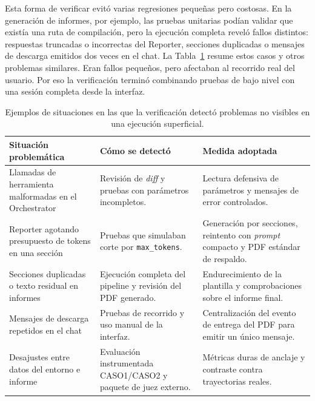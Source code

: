 Esta forma de verificar evitó varias regresiones pequeñas pero costosas. En la
generación de informes, por ejemplo, las pruebas unitarias podían validar
que existía una ruta de compilación, pero la ejecución completa reveló
fallos distintos: respuestas truncadas o incorrectas del Reporter, secciones
duplicadas o mensajes de descarga emitidos dos veces en el chat. La
Tabla~\ref{tab:problemas-verificacion} resume estos casos y otros problemas
similares. Eran fallos pequeños, pero afectaban al recorrido real del usuario.
Por eso la verificación terminó combinando pruebas de bajo nivel con una
sesión completa desde la interfaz.

\begin{table}[H]
\begin{center}
\small
\setlength{\tabcolsep}{5pt}
\renewcommand{\arraystretch}{1.18}
\begin{tabular}{|>{\raggedright\arraybackslash}p{3.7cm}|>{\raggedright\arraybackslash}p{4.3cm}|>{\raggedright\arraybackslash}p{4.4cm}|} \hline
\textbf{Situación problemática} & \textbf{Cómo se detectó} & \textbf{Medida adoptada} \\ \hline
Llamadas de herramienta malformadas en el Orchestrator & Revisión de \textit{diff} y pruebas con parámetros incompletos. & Lectura defensiva de parámetros y mensajes de error controlados. \\ \hline
Reporter agotando presupuesto de tokens en una sección & Pruebas que simulaban corte por \texttt{max\_tokens}. & Generación por secciones, reintento con \textit{prompt} compacto y PDF estándar de respaldo. \\ \hline
Secciones duplicadas o texto residual en informes & Ejecución completa del pipeline y revisión del PDF generado. & Endurecimiento de la plantilla y comprobaciones sobre el informe final. \\ \hline
Mensajes de descarga repetidos en el chat & Pruebas de recorrido y uso manual de la interfaz. & Centralización del evento de entrega del PDF para emitir un único mensaje. \\ \hline
Desajustes entre datos del entorno e informe & Evaluación instrumentada CASO1/CASO2 y paquete de juez externo. & Métricas duras de anclaje y contraste contra trayectorias reales. \\ \hline
\end{tabular}
\caption[Problemas de verificación observados]{Ejemplos de situaciones en las
que la verificación detectó problemas no visibles en una ejecución superficial.}
\label{tab:problemas-verificacion}
\end{center}
\end{table}

